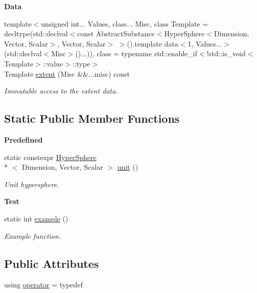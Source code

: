\begin{Indent}{\bf Data}
\begin{DoxyCompactItemize}
{\footnotesize template$<$unsigned int... Values, class... Misc, class Template  = decltype(std\-::declval$<$const Abstract\-Substance$<$\-Hyper\-Sphere$<$\-Dimension, Vector, Scalar$>$, Vector, Scalar$>$ $>$().\-template data$<$1, Values...$>$(std\-::declval$<$\-Misc$>$()...)), class  = typename std\-::enable\-\_\-if$<$!std\-::is\-\_\-void$<$\-Template$>$\-::value$>$\-::type$>$ }\\Template \hyperlink{exceptionmagrathea_1_1HyperSphere_a1ce04ded3982bd471f9e4328832a0e25}{extent} (Misc \&\&...misc) const 
\begin{DoxyCompactList}\small\item\em Immutable access to the extent data. \end{DoxyCompactList}\end{DoxyCompactItemize}
\end{Indent}
\subsection*{Static Public Member Functions}
\begin{Indent}{\bf Predefined}\par
\begin{DoxyCompactItemize}
\item 
static constexpr \hyperlink{exceptionmagrathea_1_1HyperSphere}{Hyper\-Sphere}\\*
$<$ Dimension, Vector, Scalar $>$ \hyperlink{exceptionmagrathea_1_1HyperSphere_a2c24c124f93553487fba45e7bae032aa}{unit} ()
\begin{DoxyCompactList}\small\item\em Unit hypersphere. \end{DoxyCompactList}\end{DoxyCompactItemize}
\end{Indent}
\begin{Indent}{\bf Test}\par
\begin{DoxyCompactItemize}
\item 
static int \hyperlink{exceptionmagrathea_1_1HyperSphere_a0124f9301a1e7cb15fdc14bf1cd3a231}{example} ()
\begin{DoxyCompactList}\small\item\em Example function. \end{DoxyCompactList}\end{DoxyCompactItemize}
\end{Indent}
\subsection*{Public Attributes}
\begin{DoxyCompactItemize}
\item 
using \hyperlink{exceptionmagrathea_1_1HyperSphere_a76dfa1f063e9f6d4636f97d4dc2c2056}{operator} = typedef
\end{DoxyCompactItemize}
